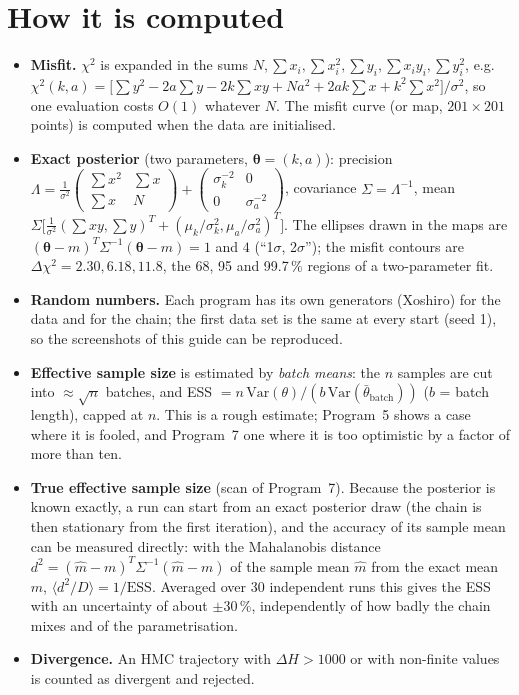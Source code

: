 \documentclass[11pt,a4paper]{article}
\newcommand{\vth}{\boldsymbol{\theta}}
\begin{document}
\section{How it is computed}\label{sec:numerics}
\begin{itemize}
\item \textbf{Misfit.} $\chi^2$ is expanded in the sums $N,\sum x_i,\sum x_i^2,\sum y_i,\sum x_iy_i,\sum y_i^2$,
  e.g.\ $\chi^2(k,a)=\bigl[\sum y^2-2a\sum y-2k\sum xy+Na^2+2ak\sum x+k^2\sum x^2\bigr]/\sigma^2$, so one
  evaluation costs $O(1)$ whatever $N$. The misfit curve (or map, $201\times201$ points) is computed when the data
  are initialised.
\item \textbf{Exact posterior} (two parameters, $\vth=(k,a)$): precision
  $\Lambda=\frac1{\sigma^2}\begin{pmatrix}\sum x^2&\sum x\\ \sum x&N\end{pmatrix}+
  \begin{pmatrix}\sigma_k^{-2}&0\\0&\sigma_a^{-2}\end{pmatrix}$, covariance $\Sigma=\Lambda^{-1}$, mean
  $\Sigma\bigl[\frac1{\sigma^2}(\sum xy,\sum y)^T+(\mu_k/\sigma_k^2,\mu_a/\sigma_a^2)^T\bigr]$. The ellipses drawn
  in the maps are $(\vth-m)^T\Sigma^{-1}(\vth-m)=1$ and $4$ (``1$\sigma$, 2$\sigma$''); the misfit contours are
  $\Delta\chi^2=2.30,6.18,11.8$, the 68, 95 and 99.7\,\% regions of a two-parameter fit.
\item \textbf{Random numbers.} Each program has its own generators (Xoshiro) for the data and for the chain;
  the first data set is the same at every start (seed 1), so the screenshots of this guide can be reproduced.
\item \textbf{Effective sample size} is estimated by \emph{batch means}: the $n$ samples are cut into
  $\approx\sqrt{n}$ batches, and ESS $=n\,\mathrm{Var}(\theta)/(b\,\mathrm{Var}(\bar\theta_\text{batch}))$ ($b$ = batch
  length), capped at $n$. This is a rough estimate; Program~5 shows a case where it is fooled, and Program~7 one
  where it is too optimistic by a factor of more than ten.
\item \textbf{True effective sample size} (scan of Program~7). Because the posterior is known exactly, a run can
  start from an exact posterior draw (the chain is then stationary from the first iteration), and the accuracy of
  its sample mean can be measured directly: with the Mahalanobis distance
  $d^2=(\hat m-m)^T\Sigma^{-1}(\hat m-m)$ of the sample mean $\hat m$ from the exact mean $m$,
  $\langle d^2/D\rangle = 1/\text{ESS}$. Averaged over 30 independent runs this gives the ESS with an uncertainty of
  about $\pm30\,\%$, independently of how badly the chain mixes and of the parametrisation.
\item \textbf{Divergence.} An HMC trajectory with $\Delta H>1000$ or with non-finite values is counted as
  divergent and rejected.
\end{itemize}
\end{document}
